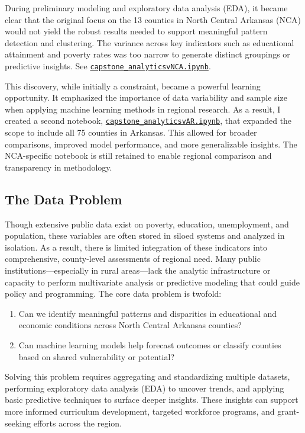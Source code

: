 \documentclass[12pt]{llncs}
\begin{document}
\begin{tcolorbox}[colback=gray!10,colframe=black,title=Developer Note: From NCA Regional to Statewide Scope]
During preliminary modeling and exploratory data analysis (EDA), it became clear that the original focus on the 13 counties in North Central Arkansas (NCA) would not yield the robust results needed to support meaningful pattern detection and clustering. The variance across key indicators such as educational attainment and poverty rates was too narrow to generate distinct groupings or predictive insights. See \href{run:capstone_analyticsvNCA.ipynb}{\texttt{capstone\_analyticsvNCA.ipynb}}.

This discovery, while initially a constraint, became a powerful learning opportunity. It emphasized the importance of data variability and sample size when applying machine learning methods in regional research. As a result, I created a second notebook, \href{run:capstone_analyticsvAR.ipynb}{\texttt{capstone\_analyticsvAR.ipynb}}, that expanded the scope to include all 75 counties in Arkansas. This allowed for broader comparisons, improved model performance, and more generalizable insights. The NCA-specific notebook is still retained to enable regional comparison and transparency in methodology.
\end{tcolorbox}


\subsection{The Data Problem}
Though extensive public data exist on poverty, education, unemployment, and population, these variables are often stored in siloed systems and analyzed in isolation. As a result, there is limited integration of these indicators into comprehensive, county-level assessments of regional need. Many public institutions—especially in rural areas—lack the analytic infrastructure or capacity to perform multivariate analysis or predictive modeling that could guide policy and programming.
The core data problem is twofold:
\begin{enumerate}
    \item Can we identify meaningful patterns and disparities in educational and economic conditions across North Central Arkansas counties?
    \item Can machine learning models help forecast outcomes or classify counties based on shared vulnerability or potential?
\end{enumerate}
    
Solving this problem requires aggregating and standardizing multiple datasets, performing exploratory data analysis (EDA) to uncover trends, and applying basic predictive techniques to surface deeper insights. These insights can support more informed curriculum development, targeted workforce programs, and grant-seeking efforts across the region.
\end{document}
